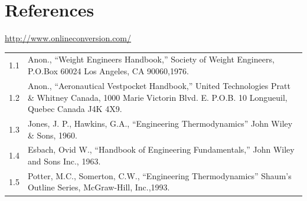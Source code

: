 \documentclass[
]{book}
\begin{document}
\hypertarget{references}{%
\section{References}\label{references}}

\url{http://www.onlineconversion.com/}

\begin{longtable}[]{@{}ll@{}}
\toprule
\endhead
\begin{minipage}[t]{0.06\columnwidth}\raggedright
1.1\strut
\end{minipage} & \begin{minipage}[t]{0.88\columnwidth}\raggedright
Anon., ``Weight Engineers Handbook,'' Society of Weight Engineers, P.O.Box 60024 Los Angeles, CA 90060,1976.\strut
\end{minipage}\tabularnewline
\begin{minipage}[t]{0.06\columnwidth}\raggedright
1.2\strut
\end{minipage} & \begin{minipage}[t]{0.88\columnwidth}\raggedright
Anon., ``Aeronautical Vestpocket Handbook,'' United Technologies Pratt \& Whitney Canada, 1000 Marie Victorin Blvd. E. P.O.B. 10 Longueuil, Quebec Canada J4K 4X9.\strut
\end{minipage}\tabularnewline
\begin{minipage}[t]{0.06\columnwidth}\raggedright
1.3\strut
\end{minipage} & \begin{minipage}[t]{0.88\columnwidth}\raggedright
Jones, J. P., Hawkins, G.A., ``Engineering Thermodynamics'' John Wiley \& Sons, 1960.\strut
\end{minipage}\tabularnewline
\begin{minipage}[t]{0.06\columnwidth}\raggedright
1.4\strut
\end{minipage} & \begin{minipage}[t]{0.88\columnwidth}\raggedright
Esbach, Ovid W., ``Handbook of Engineering Fundamentals,'' John Wiley and Sons Inc., 1963.\strut
\end{minipage}\tabularnewline
\begin{minipage}[t]{0.06\columnwidth}\raggedright
1.5\strut
\end{minipage} & \begin{minipage}[t]{0.88\columnwidth}\raggedright
Potter, M.C., Somerton, C.W., ``Engineering Thermodynamics'' Shaum's Outline Series, McGraw-Hill, Inc.,1993.\strut
\end{minipage}\tabularnewline

\end{longtable}
\end{document}
